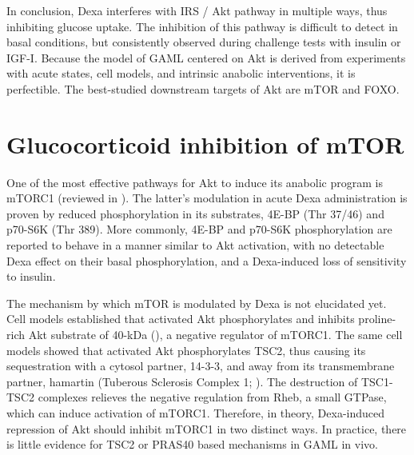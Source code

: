 \documentclass[12pt,english]{report}\usepackage[]{graphicx}\usepackage[]{color}
\begin{document}
In conclusion, Dexa interferes with IRS / Akt pathway in multiple
ways, thus inhibiting glucose uptake. The inhibition of this pathway
is difficult to detect in basal conditions, but consistently observed
during challenge tests with insulin or IGF-I. Because the model of
GAML centered on Akt is derived from experiments with acute states,
cell models, and intrinsic anabolic interventions, it is perfectible.
The best-studied downstream targets of Akt are mTOR and FOXO.


\section{Glucocorticoid inhibition of mTOR}

One of the most effective pathways for Akt to induce its anabolic
program is mTORC1 (reviewed in \citep{guertin2007defining,laplante2009mtor,inoki2002tsc2}).
The latter's modulation in acute Dexa administration is proven by
reduced phosphorylation in its substrates, 4E-BP (Thr 37/46) and p70-S6K
(Thr 389)\citep{shah2000glucocorticoids}. More commonly, 4E-BP and
p70-S6K phosphorylation are reported to behave in a manner similar
to Akt activation, with no detectable Dexa effect on their basal phosphorylation,
and a Dexa-induced loss of sensitivity to insulin\citep{long2001dexamethasone,dardevet1999glucocorticoid-induced}.

The mechanism by which mTOR is modulated by Dexa is not elucidated
yet. Cell models established that activated Akt phosphorylates and
inhibits proline-rich Akt substrate of 40-kDa (),
a negative regulator of mTORC1\citep{sancak2007pras40}. The same
cell models showed that activated Akt phosphorylates TSC2, thus causing
its sequestration with a cytosol partner, 14-3-3, and away from its
transmembrane partner, hamartin (Tuberous Sclerosis Complex 1; )\citep{cai2006activity}.
The destruction of TSC1-TSC2 complexes relieves the negative regulation
from Rheb, a small GTPase, which can induce activation of mTORC1.
Therefore, in theory, Dexa-induced repression of Akt should inhibit
mTORC1 in two distinct ways. In practice, there is little evidence
for TSC2 or PRAS40 based mechanisms in GAML in vivo.
\end{document}
